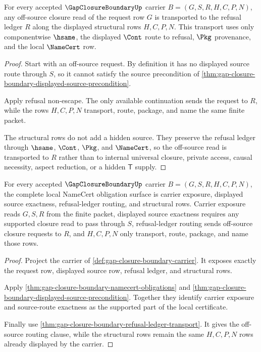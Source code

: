 \begin{theorem}
\label{thm:gap-closure-boundary-refusal-ledger-transport}
For every accepted $\GapClosureBoundaryUp$ carrier $B=(G,S,R,H,C,P,N)$, any off-source closure read of the request row $G$ is transported to the refusal ledger $R$ along the displayed structural rows $H,C,P,N$. This transport uses only componentwise $\hsame$, the displayed $\Cont$ route to refusal, $\Pkg$ provenance, and the local $\NameCert$ row.
\end{theorem}
\begin{proof}
Start with an off-source request. By definition it has no displayed source route through $S$, so it cannot satisfy the source precondition of \autoref{thm:gap-closure-boundary-displayed-source-precondition}.

Apply refusal non-escape. The only available continuation sends the request to $R$, while the rows $H,C,P,N$ transport, route, package, and name the same finite packet.

The structural rows do not add a hidden source. They preserve the refusal ledger through $\hsame$, $\Cont$, $\Pkg$, and $\NameCert$, so the off-source read is transported to $R$ rather than to internal universal closure, private access, causal necessity, aspect reduction, or a hidden $\mathsf{T}$ supply.
\end{proof}

\begin{theorem}
\label{thm:gap-closure-boundary-namecert-obligation-triad}
For every accepted $\GapClosureBoundaryUp$ carrier $B=(G,S,R,H,C,P,N)$, the complete local NameCert obligation surface is carrier exposure, displayed source exactness, refusal-ledger routing, and structural rows. Carrier exposure reads $G,S,R$ from the finite packet, displayed source exactness requires any supported closure read to pass through $S$, refusal-ledger routing sends off-source closure requests to $R$, and $H,C,P,N$ only transport, route, package, and name those rows.
\end{theorem}
\begin{proof}
Project the carrier of \autoref{def:gap-closure-boundary-carrier}. It exposes exactly the request row, displayed source row, refusal ledger, and structural rows.

Apply \autoref{thm:gap-closure-boundary-namecert-obligations} and \autoref{thm:gap-closure-boundary-displayed-source-precondition}. Together they identify carrier exposure and source-route exactness as the supported part of the local certificate.

Finally use \autoref{thm:gap-closure-boundary-refusal-ledger-transport}. It gives the off-source routing clause, while the structural rows remain the same $H,C,P,N$ rows already displayed by the carrier.
\end{proof}

